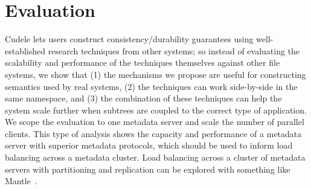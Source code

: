 \section{Evaluation}
\label{sec:evaluation}

Cudele lets users construct consistency/durability guarantees using
well-established research techniques from other systems; so instead of
evaluating the scalability and performance of the techniques themselves against
other file systems, we show that (1) the mechanisms we propose are useful for
constructing semantics used by real systems, (2) the techniques can work
side-by-side in the same namespace, and (3) the combination of these techniques
can help the system scale further when subtrees are coupled to the correct type
of application.  We scope the evaluation to one metadata server and scale the
number of parallel clients. This type of analysis shows the capacity and
performance of a metadata server with superior metadata protocols, which should
be used to inform load balancing across a metadata cluster. Load balancing
across a cluster of metadata servers with partitioning and replication can be
explored with something like Mantle~\cite{sevilla:sc15-mantle}.



